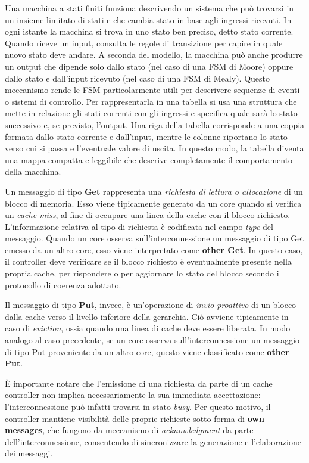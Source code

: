 \begin{info}
    Una macchina a stati finiti funziona descrivendo un sistema che può trovarsi in un insieme limitato di stati e che cambia stato in base agli ingressi ricevuti. In ogni istante la macchina si trova in uno stato ben preciso, detto stato corrente. Quando riceve un input, consulta le regole di transizione per capire in quale nuovo stato deve andare. A seconda del modello, la macchina può anche produrre un output che dipende solo dallo stato (nel caso di una FSM di Moore) oppure dallo stato e dall'input ricevuto (nel caso di una FSM di Mealy). Questo meccanismo rende le FSM particolarmente utili per descrivere sequenze di eventi o sistemi di controllo.
    Per rappresentarla in una tabella si usa una struttura che mette in relazione gli stati correnti con gli ingressi e specifica quale sarà lo stato successivo e, se previsto, l'output. Una riga della tabella corrisponde a una coppia formata dallo stato corrente e dall'input, mentre le colonne riportano lo stato verso cui si passa e l'eventuale valore di uscita. In questo modo, la tabella diventa una mappa compatta e leggibile che descrive completamente il comportamento della macchina.
\end{info}

\noindent
Un messaggio di tipo \textbf{Get} rappresenta una \textit{richiesta di lettura o allocazione} di un blocco di memoria. Esso viene tipicamente generato da un core quando si verifica un 
\textit{cache miss}, al fine di occupare una linea della cache con il blocco richiesto. 
L'informazione relativa al tipo di richiesta è codificata nel campo \textit{type} del messaggio. 
Quando un core osserva sull'interconnessione un messaggio di tipo Get emesso da un altro core, esso viene interpretato come \textbf{other Get}. In questo caso, il controller deve verificare se il blocco richiesto è eventualmente presente nella propria cache, per rispondere o per aggiornare lo stato del blocco secondo il protocollo di coerenza adottato.  

\noindent
Il messaggio di tipo \textbf{Put}, invece, è un'operazione di \textit{invio proattivo} di un blocco dalla cache verso il livello inferiore della gerarchia. Ciò avviene tipicamente in caso di \textit{eviction}, ossia quando una linea di cache deve essere liberata. In modo analogo al caso precedente, se un core osserva sull’interconnessione un messaggio di tipo Put proveniente da un altro core, questo viene classificato come \textbf{other Put}.  

\noindent
È importante notare che l'emissione di una richiesta da parte di un cache controller non implica necessariamente la sua immediata accettazione: l'interconnessione può infatti trovarsi in stato \textit{busy}. Per questo motivo, il controller mantiene visibilità delle proprie richieste sotto forma di \textbf{own messages}, che fungono da meccanismo di \textit{acknowledgment} da parte dell'interconnessione, consentendo di sincronizzare la generazione e l'elaborazione dei messaggi.  

